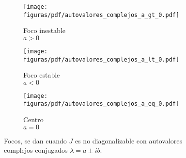 \documentclass[../ecuaciones_diferenciales.tex]{subfiles}
\begin{document}
\begin{figure}[ht]
  \begin{subfigure}{0.33\textwidth}
    \centering
    \texttt{[image: figuras/pdf/autovalores\_complejos\_a\_gt\_0.pdf]}
    \caption*{Foco inestable \\ \(a > 0\)}
  \end{subfigure}%
  \begin{subfigure}{0.33\textwidth}
    \centering
    \texttt{[image: figuras/pdf/autovalores\_complejos\_a\_lt\_0.pdf]}
    \caption*{Foco estable \\ \(a < 0\)}
  \end{subfigure}%
  \begin{subfigure}{0.33\textwidth}
    \centering
    \texttt{[image: figuras/pdf/autovalores\_complejos\_a\_eq\_0.pdf]}
    \caption*{Centro \\ \(a = 0\)}
  \end{subfigure}
  \caption{Focos, se dan cuando \(J\) es no diagonalizable con autovalores complejos conjugados \(\lambda = a \pm ib\).}
\end{figure}
\end{document}
